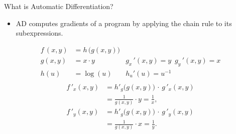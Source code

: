 \documentclass[dvipsnames, aspectratio=169]{beamer}
\begin{document}
\begin{frame}[fragile]{What is Automatic Differentiation?}
\begin{itemize}
  \item AD computes gradients of a program by applying the chain rule to its subexpressions.
\end{itemize}
\begin{align*}
f\,(x,y) &= h\,\!\big(g(x,y)\big) \\
g(x, y) &= x \cdot y \;& g_x\,'(x,y) = y \:\; g_y\,'(x,y) = x\\[2pt]
h(u) &= \log(u) \;& h_u'(u) = u^{-1}\\
\end{align*}
\vspace{-1cm}
\begin{align*}
f\,'_x(x,y)
  &= h'_g\!\big(g(x,y)\big)\,\cdot\, g\,'_x(x,y) \\
  &= \frac{1}{g(x, y)} \cdot y = \frac{1}{x}, \\[6pt]
f\,'_y(x,y)
  &= h'_g\!\big(g(x,y)\big)\,\cdot\, g\,'_y(x,y) \\
  &= \frac{1}{g(x, y)} \cdot x = \frac{1}{y}.
\end{align*}
\end{frame}
\end{document}
